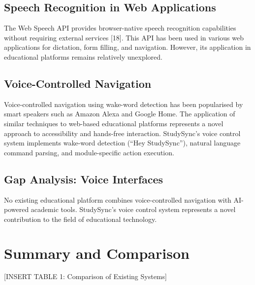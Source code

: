 \documentclass[12pt,a4paper]{report}
\begin{document}
\subsection{Speech Recognition in Web Applications}

The Web Speech API provides browser-native speech recognition capabilities without requiring external services [18]. This API has been used in various web applications for dictation, form filling, and navigation. However, its application in educational platforms remains relatively unexplored.

\subsection{Voice-Controlled Navigation}

Voice-controlled navigation using wake-word detection has been popularised by smart speakers such as Amazon Alexa and Google Home. The application of similar techniques to web-based educational platforms represents a novel approach to accessibility and hands-free interaction. StudySync's voice control system implements wake-word detection (``Hey StudySync''), natural language command parsing, and module-specific action execution.

\subsection{Gap Analysis: Voice Interfaces}

No existing educational platform combines voice-controlled navigation with AI-powered academic tools. StudySync's voice control system represents a novel contribution to the field of educational technology.

\section{Summary and Comparison}

[INSERT TABLE 1: Comparison of Existing Systems]
\end{document}
